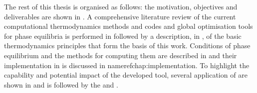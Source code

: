 	
	The rest of this thesis is organised as follows: the motivation, objectives and deliverables are shown in . A comprehensive literature review of the current computational thermodynamics methods and codes and global optimisation tools for phase equilibria is performed in  followed by a description, in , of the basic thermodynamics principles that form the basis of this work. Conditions of phase equilibrium and the methods for computing them are described in  and their implementation in {\GEM} is discussed in nameref{chap:implementation}. To highlight the capability and potential impact of the developed tool, several application of {\GEM} are shown in  and is followed by the  and . 